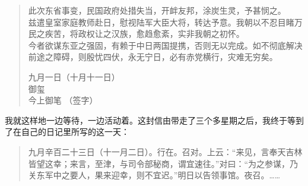 \begin{quote}
	此次东省事变，民国政府处措失当，开衅友邦，涂炭生灵，予甚悯之。\\

兹遣皇室家庭教师赴日，慰视陆军大臣大将，转达予意。我朝以不忍目睹万民之疾苦，将政权让之汉族，愈趋愈紊，实非我朝之初怀。\\

今者欲谋东亚之强固，有赖于中日两国提携，否则无以完成。如不彻底解决前途之障碍，则殷忧四伏，永无宁日，必有赤党横行，灾难无穷矣。\\

\begin{flushright}
	九月一日（十月十一日）\\

御玺\\

今上御笔 （签字）\\
\end{flushright}
\end{quote}

我就这样地一边等待，一边活动着。这封信由带走了三个多星期之后，我终于等到了在自己的日记里所写的这一天：\\

\begin{quote}
	九月辛百二十三日（十一月二日）。行在。召对。上云：“来见，言奉天吉林皆望这幸；来言，至津，与司令部秘商，谓宜速往。”对曰：“为之参谋，乃关东军中之要人，果来迎幸，则不宜迟。”明日以告领事馆。夜召。……\\
\end{quote}
